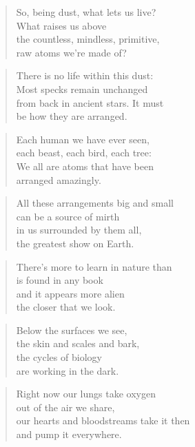 \documentclass[10pt,a4paper]{article}
\begin{document}
\begin{multicols}{2}


\begin{verse}
So, being dust, what lets us live?\\
What raises us above\\
the countless, mindless, primitive,\\
raw atoms we’re made of?
\end{verse}

\begin{verse}
There is no life within this dust:\\
Most specks remain unchanged\\
from back in ancient stars. It must\\
be how they are arranged.
\end{verse}

\begin{verse}
Each human we have ever seen,\\
each beast, each bird, each tree:\\
We all are atoms that have been\\
arranged amazingly.
\end{verse}

\begin{verse}
All these arrangements big and small\\
can be a source of mirth\\
in us surrounded by them all,\\
the greatest show on Earth.
\end{verse}

\begin{verse}
There’s more to learn in nature than\\
is found in any book\\
and it appears more alien\\
the closer that we look.
\end{verse}

\begin{verse}
Below the surfaces we see,\\
the skin and scales and bark,\\
the cycles of biology\\
are working in the dark.
\end{verse}

\begin{verse}
Right now our lungs take oxygen\\
out of the air we share,\\
our hearts and bloodstreams take it then\\
and pump it everywhere.
\end{verse}


\end{multicols}
\end{document}
